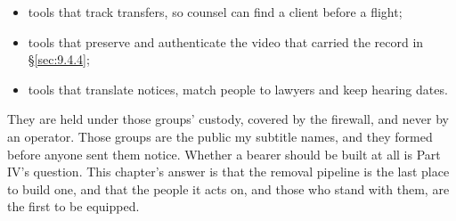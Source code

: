 \begin{itemize}
\item tools that track transfers, so counsel can find a client before a flight;
\item tools that preserve and authenticate the video that carried the record in \S\ref{sec:9.4.4};
\item tools that translate notices, match people to lawyers and keep hearing dates.
\end{itemize}

They are held under those groups' custody, covered by the firewall, and never by an operator. Those groups are the public my subtitle names, and they formed before anyone sent them notice. Whether a bearer should be built at all is Part IV's question. This chapter's answer is that the removal pipeline is the last place to build one, and that the people it acts on, and those who stand with them, are the first to be equipped.
